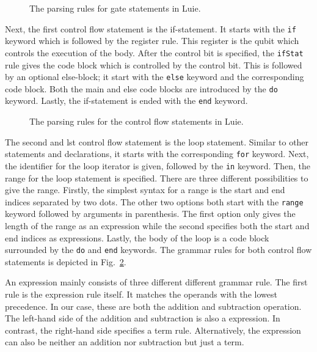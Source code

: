 \begin{figure}[]
    \centering
    
    \caption{The parsing rules for gate statements in Luie.}
    \label{fig:implementation_grammarGateStatements}
\end{figure}

Next, the first control flow statement is the if-statement. It starts with the \texttt{if} keyword which is followed by the register rule. This register is the qubit which controls the execution of the body. After the control bit is specified, the \texttt{ifStat} rule gives the code block which is controlled by the control bit. This is followed by an optional else-block; it start with the \texttt{else} keyword and the corresponding code block. Both the main and else code blocks are introduced by the \texttt{do} keyword. Lastly, the if-statement is ended with the \texttt{end} keyword.

\begin{figure}[b]
    \centering
    
    \caption{The parsing rules for the control flow statements in Luie.}
    \label{fig:implementation_controlFlowStatements}
\end{figure}

The second and lst control flow statement is the loop statement. Similar to other statements and declarations, it starts with the corresponding \texttt{for} keyword. Next, the identifier for the loop iterator is given, followed by the \texttt{in} keyword. Then, the range for the loop statement is specified. There are three different possibilities to give the range. Firstly, the simplest syntax for a range is the start and end indices separated by two dots. The other two options both start with the \texttt{range} keyword followed by arguments in parenthesis. The first option only gives the length of the range as an expression while the second specifies both the start and end indices as expressions. Lastly, the body of the loop is a code block surrounded by the \texttt{do} and \texttt{end} keywords.   
The grammar rules for both control flow statements is depicted in Fig.~\ref{fig:implementation_controlFlowStatements}.

An expression mainly consists of three different different grammar rule. The first rule is the expression rule itself. It matches the operands with the lowest precedence. In our case, these are both the addition and subtraction operation. The left-hand side of the addition and subtraction is also a expression. In contrast, the right-hand side specifies a term rule. Alternatively, the expression can also be neither an addition nor subtraction but just a term. 

